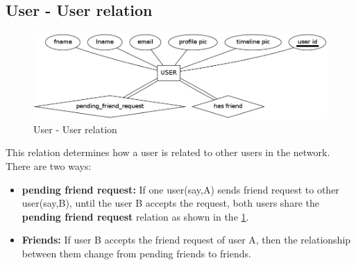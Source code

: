 \documentclass{article}
\begin{document}
\subsection{User - User relation}
\begin{figure}[h!]
\centering
\includegraphics[scale=0.4]{user_friend.png}
\caption{User - User relation}
\label{fig1}
\end{figure}
This relation determines how a user is related to other users in the network. There are two ways:
\begin{itemize}
\item \textbf{pending friend request:} If one user(say,A) sends friend request to other user(say,B), until the user B accepts the request, both users share the \textbf{pending friend request} relation as shown in the \ref{fig1}.
\item \textbf{Friends:} If user B accepts the friend request of user A, then the relationship between them change from pending friends to friends. 
\end{itemize}
\end{document}

